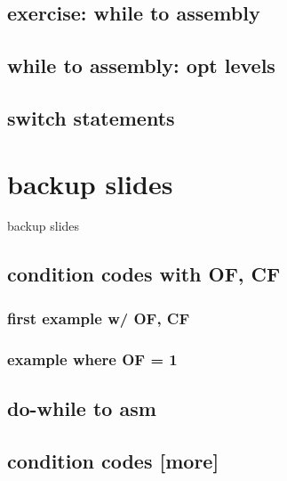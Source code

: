 

\subsection{exercise: while to assembly}



\subsection{while to assembly: opt levels}



\subsection{switch statements}

  

\section{backup slides}
\begin{frame}{backup slides}
\end{frame}

\subsection{condition codes with OF, CF}

\subsubsection{first example w/ OF, CF}


\subsubsection{example where OF = 1}


\subsection{do-while to asm}


\subsection{condition codes [more]}


